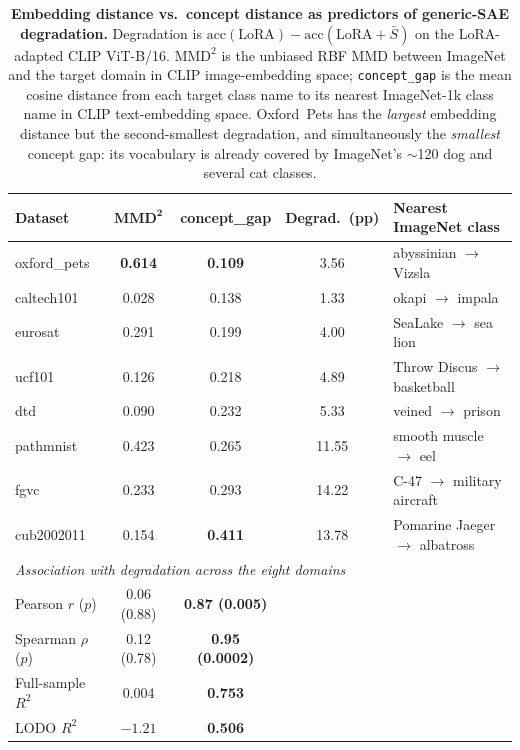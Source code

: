 \begin{table}[htbp]
\centering
\small
\caption{\textbf{Embedding distance vs.\ concept distance as predictors of generic-SAE
degradation.} Degradation is $\mathrm{acc}(\text{LoRA})-\mathrm{acc}(\text{LoRA}+\bar{S})$
on the LoRA-adapted CLIP ViT-B/16. $\mathrm{MMD}^2$ is the unbiased RBF MMD between
ImageNet and the target domain in CLIP image-embedding space; \texttt{concept\_gap} is
the mean cosine distance from each target class name to its nearest ImageNet-1k class
name in CLIP text-embedding space. Oxford~Pets has the \emph{largest} embedding distance
but the second-smallest degradation, and simultaneously the \emph{smallest} concept gap:
its vocabulary is already covered by ImageNet's $\sim$120 dog and several cat classes.}
\label{tab:concept_gap}
\setlength{\tabcolsep}{5pt}
\begin{tabular}{lcccl}
\toprule
\textbf{Dataset} & $\mathbf{MMD^2}$ & \textbf{concept\_gap} & \textbf{Degrad.\ (pp)} & \textbf{Nearest ImageNet class} \\
\midrule
oxford\_pets & \bf 0.614 & \bf 0.109 & 3.56  & abyssinian $\rightarrow$ Vizsla \\
caltech101   & 0.028 & 0.138 & 1.33  & okapi $\rightarrow$ impala \\
eurosat      & 0.291 & 0.199 & 4.00  & SeaLake $\rightarrow$ sea lion \\
ucf101       & 0.126 & 0.218 & 4.89  & Throw Discus $\rightarrow$ basketball \\
dtd          & 0.090 & 0.232 & 5.33  & veined $\rightarrow$ prison \\
pathmnist    & 0.423 & 0.265 & 11.55 & smooth muscle $\rightarrow$ eel \\
fgvc         & 0.233 & 0.293 & 14.22 & C-47 $\rightarrow$ military aircraft \\
cub2002011   & 0.154 & \bf 0.411 & 13.78 & Pomarine Jaeger $\rightarrow$ albatross \\
\midrule
\multicolumn{5}{l}{\emph{Association with degradation across the eight domains}} \\
\quad Pearson $r$ ($p$)   & \multicolumn{1}{c}{0.06 (0.88)} & \multicolumn{1}{c}{\bf 0.87 (0.005)} & & \\
\quad Spearman $\rho$ ($p$) & \multicolumn{1}{c}{0.12 (0.78)} & \multicolumn{1}{c}{\bf 0.95 (0.0002)} & & \\
\quad Full-sample $R^2$   & \multicolumn{1}{c}{0.004} & \multicolumn{1}{c}{\bf 0.753} & & \\
\quad LODO $R^2$          & \multicolumn{1}{c}{$-1.21$} & \multicolumn{1}{c}{\bf 0.506} & & \\
\bottomrule
\end{tabular}
\end{table}
